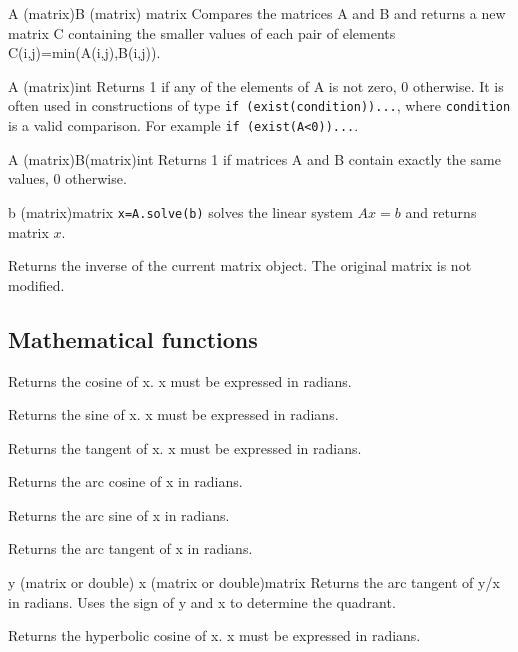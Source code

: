 {A (matrix)\newline B (matrix)}
{matrix}
{Compares the matrices A and B and returns a new matrix C containing the smaller values of each pair of 
elements C(i,j)=min(A(i,j),B(i,j)). }

{A (matrix)}{int}
{Returns 1 if any of the elements of A is not zero, 0 otherwise. It is often used in constructions
of type \texttt{if (exist(condition))...}, where \texttt{condition} is a valid comparison. For example
\texttt{if (exist(A<0))...}.}

{A (matrix)\newline B(matrix)}{int}
{Returns 1 if matrices A and B contain exactly the same values, 0 otherwise.}

{b (matrix)}{matrix}
{\texttt{x=A.solve(b)} solves the linear system $Ax=b$ and returns matrix $x$.}

{Returns the inverse of the current matrix object. The original matrix is not modified.}

\subsection{Mathematical functions}

{Returns the cosine of x. x must be expressed in radians.}

{Returns the sine of x. x must be expressed in radians.}

{Returns the tangent of x. x must be expressed in radians.}

{Returns the arc cosine of x in radians.}

{Returns the arc sine of x in radians.}

{Returns the arc tangent of x in radians.}

{y (matrix or double)\newline
x (matrix or double)}{matrix}
{Returns the arc tangent of y/x in radians. Uses the sign of y and x to determine the quadrant.}

{Returns the hyperbolic cosine of x. x must be expressed in radians.}

